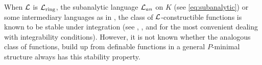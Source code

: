 When ${\mathcal L}$ is ${\mathcal L}_{\rm ring}$, the subanalytic language $\mathcal{L}_{an}$ on $K$ (see \ref{eq:subanalytic}) or some intermediary languages as in \cite{CLip}, the class of $\mathcal{L}$-constructible functions is known to be stable under integration (see \cite{denef-2000}, \cite{Clu-2003}, and \cite{Clu-Gor-Hal-14} for the most convenient dealing with integrability conditions). %
However, it is not known whether the analogous class of functions, build up from definable functions in a general $P$-minimal structure always has this stability property. 
%
%
%
%
%
